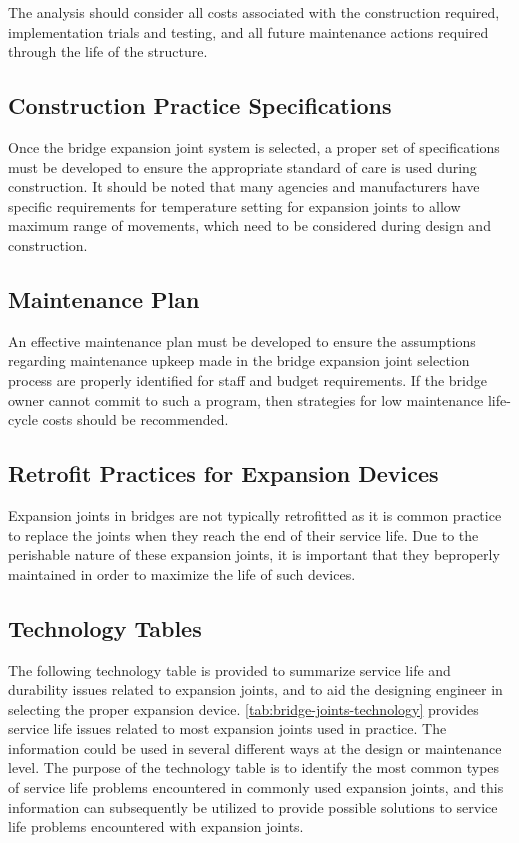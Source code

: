 The analysis should consider all costs associated with the construction required, implementation trials and testing, and all future maintenance actions required through the life of the structure.

\subsection{Construction Practice Specifications}
Once the bridge expansion joint system is selected, a proper set of specifications must be developed to ensure the appropriate standard of care is used during construction. It should be noted that many agencies and manufacturers have specific requirements for temperature setting for expansion joints to allow maximum range of movements, which need to be considered during design and construction.


\subsection{Maintenance Plan}
An effective maintenance plan must be developed to ensure the assumptions regarding maintenance upkeep made in the bridge expansion joint selection process are properly identified for staff and budget requirements. If the bridge owner cannot commit to such a program, then strategies for low maintenance life-cycle costs should be recommended.

\subsection{Retrofit Practices for Expansion Devices}
Expansion joints in bridges are not typically retrofitted as it is common practice to replace the joints when they reach the end of their service life. Due to the perishable nature of these expansion joints, it is important that they beproperly maintained in order to maximize the life of such devices.

\subsection{Technology Tables}
The following technology table is provided to summarize service life and durability issues related to expansion joints, and to aid the designing engineer in selecting the proper expansion device. \cref{tab:bridge-joints-technology} provides service life issues related to most expansion joints used in practice. The information could be used in several different ways at the design or maintenance level. The purpose of the technology table is to identify the most common types of service life problems encountered in commonly used expansion joints, and this information can subsequently be utilized to provide possible solutions to service life problems encountered with expansion joints.

